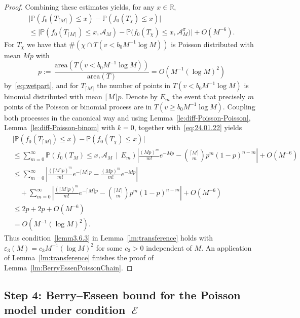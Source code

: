 \documentclass[10pt]{amsart}
\theoremstyle{definition}\newtheorem{defi}[theo]{Definition}\newtheorem{rema}[theo]{Remark}\newtheorem{exam}[theo]{Example}\newtheorem{exem}[theo]{Example}\newtheorem{nota}[theo]{Notation}
\newcommand{\bbR}{\mathbb{R}}
\newcommand{\bbP}{\mathbb{P}}
\newcommand{\clA}{\mathcal{A}}
\newcommand{\clE}{\mathcal{E}}
\newcommand{\area}{\mathrm{area}}
\begin{document}
\begin{proof}
Combining these estimates yields, for any $x\in\bbR$,
\begin{multline}\label{eq:24.01.22}
\big|\bbP\left(f_0\left(T_{\lceil M \rceil}\right)\leq x\right)-  \bbP\left(f_0\left(T_{\chi}\right)\leq x\right)\big|
\\ \leq 
\big|\bbP\left(f_0\left(T_{\lceil M \rceil}\right)\leq x, \clA_M\right)-\bbP\big(f_0\left(T_{\chi}\right)\leq x, \clA^\pi_{M}\big)\big| + O\left(M^{-6}\right).
\end{multline}
For $T_\chi$ we have that $\#(\chi \cap T(v< b_0 M^{-1} \log M))$ is Poisson distributed with mean $Mp$ with
\[
p := \, \frac{{\area}\left(T(v< b_0 M^{-1} \log M)\right)}{{\area}(T)} = O\left(M^{-1} (\log M)^2\right)
\]
by~\eqref{eq:wetpart}, and for $T_{\lceil M \rceil}$ the number of points in $T(v< b_0 M^{-1} \log M)$ is binomial distributed with mean $\lceil M \rceil p$. Denote by $E_m$ the event that precisely $m$ points of the Poisson or binomial process are in $T(v\ge b_0 M^{-1} \log M)$. Coupling both processes in the canonical way and using Lemma~\ref{le:diff-Poisson-Poisson}, Lemma~\ref{le:diff-Poisson-binom} with $k=0$, together with~\eqref{eq:24.01.22} yields
\begin{align*}
& \big| \bbP\left(f_0\left(T_{\lceil M \rceil}\right) \leq x\right)- \bbP\left(f_0(T_{\chi})\leq x\right)\big|
\\ & \leq
\sum_{m=0}^\infty \bbP\left(f_0(T_M)\leq x, \clA_M \,\middle|\, E_m\right)\left| \frac{(Mp)^m}{m!} e^{- Mp} - \binom{\lceil M \rceil}{m} p^m (1-p)^{n-m} \right| + O\left(M^{-6}\right)
\\
& \leq
\sum_{m=0}^\infty \left| \frac{(\lceil M \rceil p)^m}{m!} e^{- \lceil M \rceil p} - \frac{(M p)^m}{m!} e^{- M p} \right|
\\ & \quad + \sum_{m=0}^\infty \left| \frac{(\lceil M \rceil p)^m}{m!} e^{- \lceil M \rceil p} - \binom{\lceil M \rceil}{m} p^m (1-p)^{n-m} \right| + O\left(M^{-6}\right)
\\ & \leq 2p + 2p + O\left(M^{-6}\right)\\
& = O\left(M^{-1} (\log M)^2\right).
\end{align*}
Thus condition~\eqref{lemm3.6.3} in Lemma~\ref{lm:transference} holds with $\varepsilon_3(M)=c_3 M^{-1} (\log M)^2$ for some $c_3>0$ independent of $M$. An application of Lemma~\ref{lm:transference} finishes the proof of Lemma~\ref{lm:BerryEssenPoissonChain}.
\end{proof}



\subsection{Step 4: Berry--Esseen bound for the Poisson model under condition~\texorpdfstring{$\clE$}{E}}\label{step4}
\end{document}
